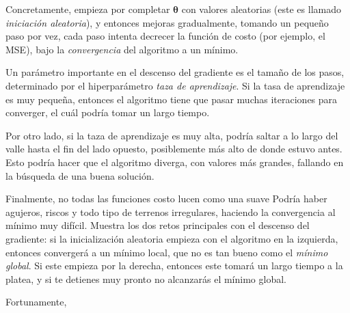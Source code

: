 Concretamente, empieza por completar $\bm{\theta}$ con valores aleatorias (este es llamado \emph{iniciación aleatoria}), y entonces mejoras gradualmente, tomando un pequeño paso por vez, cada paso intenta decrecer la función de costo (por ejemplo, el MSE), bajo la \emph{convergencia} del algoritmo a un mínimo.

Un parámetro importante en el descenso del gradiente es el tamaño de los pasos, determinado por el hiperparámetro \emph{taza de aprendizaje}. Si la tasa de aprendizaje es muy pequeña, entonces el algoritmo tiene que pasar muchas iteraciones para converger, el cuál podría tomar un largo tiempo.

Por otro lado, si la taza de aprendizaje es muy alta, podría saltar a lo largo del valle hasta el fin del lado opuesto, posiblemente más alto de donde estuvo antes. Esto podría hacer que el algoritmo diverga, con valores más grandes, fallando en la búsqueda de una buena solución.

Finalmente, no todas las funciones costo lucen como una suave %
Podría haber agujeros, riscos y todo tipo de terrenos irregulares, haciendo la convergencia al mínimo muy difícil.
Muestra los dos retos principales con el descenso del gradiente: si la inicialización aleatoria empieza con el algoritmo en la izquierda, entonces convergerá a un mínimo local, que no es tan bueno como el \emph{mínimo global}. Si este empieza por la derecha, entonces este tomará un largo tiempo a la platea, y si te detienes muy pronto no alcanzarás el mínimo global.

Fortunamente, 